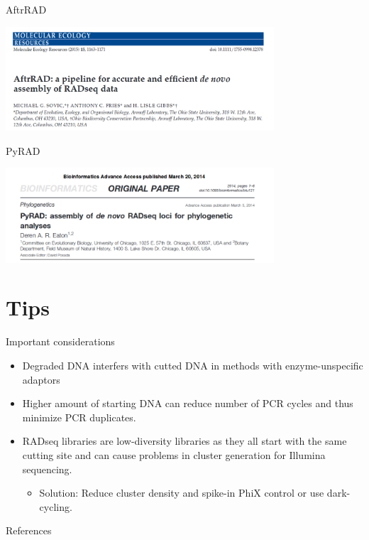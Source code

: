 \documentclass[presentation]{beamer}
\begin{document}
\begin{frame}[label=sec-4-1-9]{AftrRAD}
\begin{center}

\includegraphics[width=10cm]{AftrRAD.png}

\end{center}
\end{frame}

\begin{frame}[label=sec-4-1-10]{PyRAD}
\begin{center}

\includegraphics[width=10cm]{PyRAD.png}

\end{center}
\end{frame}
\section{Tips}
\label{sec-5}
\begin{frame}[label=sec-5-0-1]{Important considerations}
\begin{itemize}
\item Degraded DNA interfers with cutted DNA in methods with enzyme-unspecific adaptors
\item Higher amount of starting DNA can reduce number of PCR cycles and
thus minimize PCR duplicates.
\item RADseq libraries are low-diversity libraries as they all start with
the same cutting site and can cause problems in cluster generation
for Illumina sequencing.
\begin{itemize}
\item Solution: Reduce cluster density and spike-in PhiX control or use dark-cycling.
\end{itemize}
\end{itemize}
\end{frame}
\begin{frame}{References}
\raggedright
\printbibliography[sorting=nty,heading=bibnumbered]
\end{frame}
\end{document}
